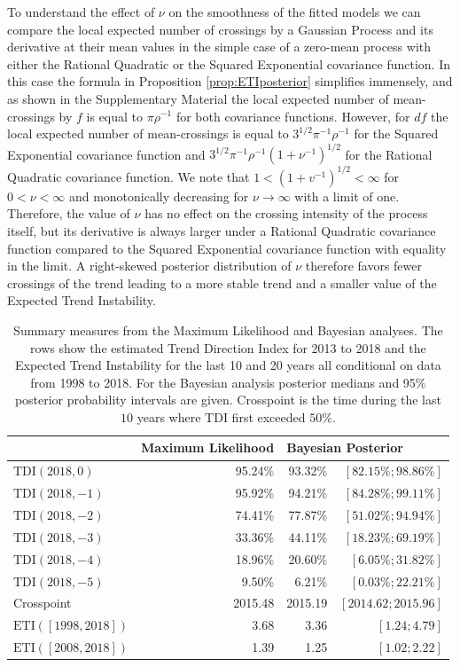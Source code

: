 \documentclass[
  11pt,
]{article}
\theoremstyle{nonumberplain}
\begin{document}
To understand the effect of \(\nu\) on the smoothness of the fitted
models we can compare the local expected number of crossings by a
Gaussian Process and its derivative at their mean values in the simple
case of a zero-mean process with either the Rational Quadratic or the
Squared Exponential covariance function. In this case the formula in
Proposition \ref{prop:ETIposterior} simplifies immensely, and as shown
in the Supplementary Material the local expected number of
mean-crossings by \(f\) is equal to \(\pi\rho^{-1}\) for both covariance
functions. However, for \(df\) the local expected number of
mean-crossings is equal to \(3^{1/2}\pi^{-1}\rho^{-1}\) for the Squared
Exponential covariance function and
\(3^{1/2}\pi^{-1}\rho^{-1}(1 + \nu^{-1})^{1/2}\) for the Rational
Quadratic covariance function. We note that
\(1 < (1 + v^{-1})^{1/2} < \infty\) for \(0 < \nu < \infty\) and
monotonically decreasing for \(\nu \rightarrow \infty\) with a limit of
one. Therefore, the value of \(\nu\) has no effect on the crossing
intensity of the process itself, but its derivative is always larger
under a Rational Quadratic covariance function compared to the Squared
Exponential covariance function with equality in the limit. A
right-skewed posterior distribution of \(\nu\) therefore favors fewer
crossings of the trend leading to a more stable trend and a smaller
value of the Expected Trend Instability.

\begin{table}[htbp]
\center
\begin{tabular}{l|rrr}
  & Maximum Likelihood & \multicolumn{2}{l}{Bayesian Posterior}\\ \hline
$\text{TDI}(2018, 0)$  & 95.24\% & 93.32\% & $[82.15\%; 98.86\%]$\\
$\text{TDI}(2018, -1)$ & 95.92\% & 94.21\% & $[84.28\%; 99.11\%]$\\
$\text{TDI}(2018, -2)$ & 74.41\% & 77.87\% & $[51.02\%; 94.94\%]$\\
$\text{TDI}(2018, -3)$ & 33.36\% & 44.11\% & $[18.23\%; 69.19\%]$\\
$\text{TDI}(2018, -4)$ & 18.96\% & 20.60\% & $[6.05\%; 31.82\%]$\\
$\text{TDI}(2018, -5)$ & 9.50\% & 6.21\% & $[0.03\%; 22.21\%]$\\ \hline
Crosspoint & 2015.48 & 2015.19 & $[2014.62; 2015.96]$\\ \hline
$\text{ETI}([1998, 2018])$ & 3.68 & 3.36 & $[1.24; 4.79]$\\
$\text{ETI}([2008, 2018])$ & 1.39 & 1.25 & $[1.02; 2.22]$
\end{tabular}
\caption{Summary measures from the Maximum Likelihood and Bayesian analyses. The rows show the estimated Trend Direction Index for 2013 to 2018 and the Expected Trend Instability for the last 10 and 20 years all conditional on data from 1998 to 2018. For the Bayesian analysis posterior medians and 95$\%$ posterior probability intervals are given. Crosspoint is the time during the last $10$ years where $\mathrm{TDI}$ first exceeded $50\%$.}
\label{tab:summaries}
\end{table}
\end{document}

